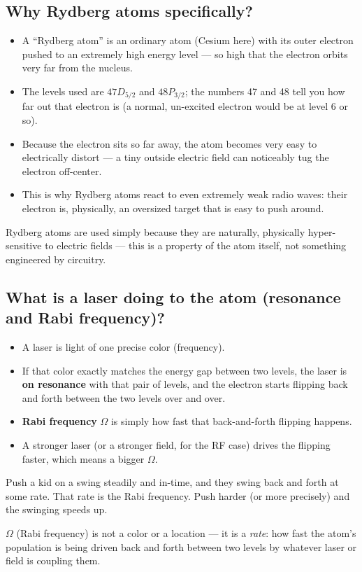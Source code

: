 \documentclass[11pt]{article}
\begin{document}
\subsection*{Why Rydberg atoms specifically?}
\begin{itemize}
\item A ``Rydberg atom'' is an ordinary atom (Cesium here) with its outer electron pushed to an extremely high energy level --- so high that the electron orbits very far from the nucleus.
\item The levels used are $47D_{5/2}$ and $48P_{3/2}$; the numbers 47 and 48 tell you how far out that electron is (a normal, un-excited electron would be at level 6 or so).
\item Because the electron sits so far away, the atom becomes very easy to electrically distort --- a tiny outside electric field can noticeably tug the electron off-center.
\item This is why Rydberg atoms react to even extremely weak radio waves: their electron is, physically, an oversized target that is easy to push around.
\end{itemize}
\begin{takeaway}
Rydberg atoms are used simply because they are naturally, physically hyper-sensitive to electric fields --- this is a property of the atom itself, not something engineered by circuitry.
\end{takeaway}

\subsection*{What is a laser doing to the atom (resonance and Rabi frequency)?}
\begin{itemize}
\item A laser is light of one precise color (frequency).
\item If that color exactly matches the energy gap between two levels, the laser is \textbf{on resonance} with that pair of levels, and the electron starts flipping back and forth between the two levels over and over.
\item \textbf{Rabi frequency} $\Omega$ is simply how fast that back-and-forth flipping happens.
\item A stronger laser (or a stronger field, for the RF case) drives the flipping faster, which means a bigger $\Omega$.
\end{itemize}
\begin{plain}
Push a kid on a swing steadily and in-time, and they swing back and forth at some rate. That rate is the Rabi frequency. Push harder (or more precisely) and the swinging speeds up.
\end{plain}
\begin{takeaway}
$\Omega$ (Rabi frequency) is not a color or a location --- it is a \emph{rate}: how fast the atom's population is being driven back and forth between two levels by whatever laser or field is coupling them.
\end{takeaway}
\end{document}
